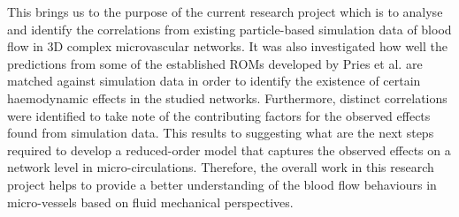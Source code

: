 \noindent This brings us to the purpose of the current research project which is to analyse and identify the correlations from existing particle-based simulation data of blood flow in 3D complex microvascular networks.\cite{2020Charles} It was also investigated how well the predictions from some of the established ROMs developed by Pries et al.\cite{A.R.Pries2005Mbvi, PriesAR1994RtBF} are matched against simulation data in order to identify the existence of certain haemodynamic effects in the studied networks. Furthermore, distinct correlations were identified to take note of the contributing factors for the observed effects found from simulation data. This results to suggesting what are the next steps required to develop a reduced-order model that captures the observed effects on a network level in micro-circulations. Therefore, the overall work in this research project helps to provide a better understanding of the blood flow behaviours in micro-vessels based on fluid mechanical perspectives. 







